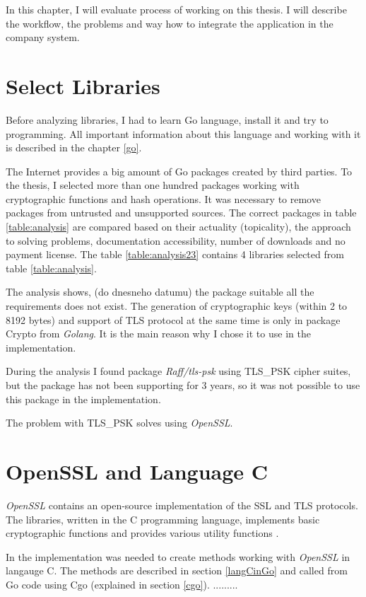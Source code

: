 \documentclass[
  digital, %
  notable,   %
  lof,     %
  lot,     %
]{fithesis3}
\begin{document}
In this chapter, I will evaluate process of working on this thesis. I will describe the workflow, 
the problems and way how to integrate the application in the company system.

\section{Select Libraries}
Before analyzing libraries, I had to learn Go language, install it and try to programming. All 
important information about this language and working with it is described in the chapter 
\ref{go}. 

The Internet provides a big amount of Go packages created by third parties. To the thesis, I 
selected more than one hundred packages working with cryptographic functions and hash operations. 
It was necessary to remove packages from untrusted and unsupported sources. The correct packages 
in table \ref{table:analysis} are compared based on their actuality (topicality), the approach to 
solving problems, documentation accessibility, number of downloads and no payment license. The 
table \ref{table:analysis23} contains 4 libraries selected from table \ref{table:analysis}. 

The analysis shows, (do dnesneho datumu) the package suitable all the requirements does not exist. 
The generation of cryptographic keys (within 2 to 8192 bytes) and support of TLS protocol at the 
same time is only in package Crypto from \textit{Golang}. It is the main reason why I chose it to 
use in the implementation. 

During the analysis I found package \textit{Raff/tls-psk} using TLS\_PSK cipher suites, but the 
package has not been supporting for 3 years, so it was not possible to use this package in the 
implementation. 

The problem with TLS\_PSK solves using \textit{OpenSSL}.

\section{OpenSSL and Language C}

\textit{OpenSSL} contains an open-source implementation of the SSL and TLS protocols. The 
libraries, written in the C programming language, implements basic cryptographic functions and 
provides various utility functions \cite{foundation}. 

In the implementation was needed to create methods working with \textit{OpenSSL} in langauge C. 
The methods are described in section \ref{langCinGo} and called from Go code using Cgo (explained 
in section \ref{cgo}). .........
\end{document}
